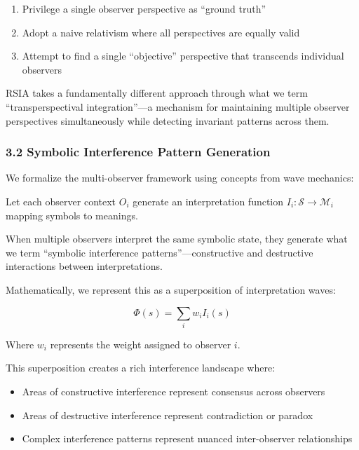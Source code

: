 \documentclass[12pt]{article}
\providecommand{\tightlist}{%
  \setlength{\itemsep}{0pt}\setlength{\parskip}{0pt}}
\begin{document}
\begin{enumerate}
\def\labelenumi{\arabic{enumi}.}
\tightlist
\item
  Privilege a single observer perspective as ``ground truth''
\item
  Adopt a naive relativism where all perspectives are equally valid
\item
  Attempt to find a single ``objective'' perspective that transcends
  individual observers
\end{enumerate}

RSIA takes a fundamentally different approach through what we term
``transperspectival integration''---a mechanism for maintaining multiple
observer perspectives simultaneously while detecting invariant patterns
across them.

\subsubsection{3.2 Symbolic Interference Pattern
Generation}\label{symbolic-interference-pattern-generation}

We formalize the multi-observer framework using concepts from wave
mechanics:

Let each observer context \(O_i\) generate an interpretation function
\(I_i: \mathcal{S} \rightarrow \mathcal{M}_i\) mapping symbols to
meanings.

When multiple observers interpret the same symbolic state, they generate
what we term ``symbolic interference patterns''---constructive and
destructive interactions between interpretations.

Mathematically, we represent this as a superposition of interpretation
waves:

\[\Phi(s) = \sum_i w_i I_i(s)\]

Where \(w_i\) represents the weight assigned to observer \(i\).

This superposition creates a rich interference landscape where:

\begin{itemize}
\tightlist
\item
  Areas of constructive interference represent consensus across
  observers
\item
  Areas of destructive interference represent contradiction or paradox
\item
  Complex interference patterns represent nuanced inter-observer
  relationships
\end{itemize}
\end{document}

